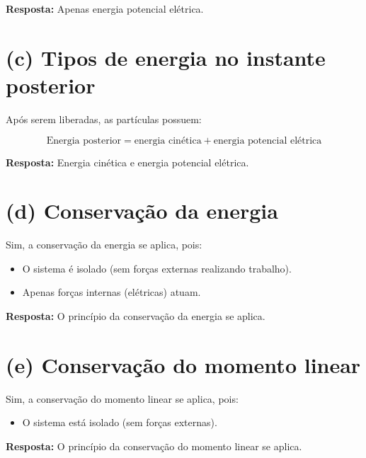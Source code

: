 \documentclass[a4paper,12pt]{article}
\begin{document}
\begin{flushleft}
\textbf{Resposta:} Apenas energia potencial elétrica.

\section*{(c) Tipos de energia no instante posterior}

Após serem liberadas, as partículas possuem:

\begin{equation}
\text{Energia posterior} = \text{energia cinética} + \text{energia potencial elétrica}
\end{equation}

\textbf{Resposta:} Energia cinética e energia potencial elétrica.

\section*{(d) Conservação da energia}

Sim, a conservação da energia se aplica, pois:

\begin{itemize}
    \item O sistema é isolado (sem forças externas realizando trabalho).
    \item Apenas forças internas (elétricas) atuam.
\end{itemize}

\textbf{Resposta:} O princípio da conservação da energia se aplica.

\section*{(e) Conservação do momento linear}

Sim, a conservação do momento linear se aplica, pois:

\begin{itemize}
    \item O sistema está isolado (sem forças externas).
\end{itemize}

\textbf{Resposta:} O princípio da conservação do momento linear se aplica.
\end{flushleft}
\end{document}
